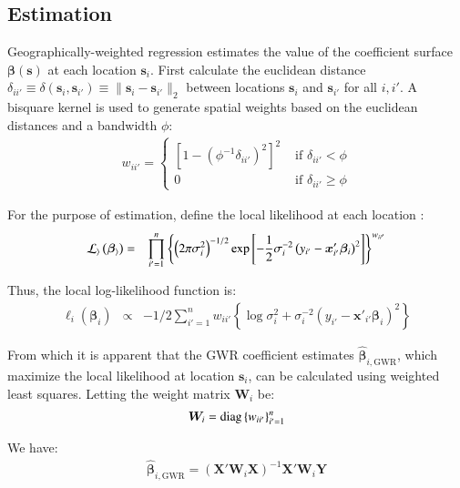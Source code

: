 \documentclass[authoryear, review, 11pt]{elsarticle}
\begin{document}
	\subsection{Estimation}
		
	Geographically-weighted regression estimates the value of the coefficient surface $\bm{\beta}(\bm{s})$ at each location $\bm{s}_i$. First calculate the euclidean distance $\delta_{ii'} \equiv \delta\left(\bm{s}_i, \bm{s}_{i'}\right) \equiv \|\bm{s}_i  -\bm{s}_{i'}\|_2$ between locations $\bm{s}_i$ and $\bm{s}_{i'}$ for all $i, i'$. A bisquare kernel is used to generate spatial weights based on the euclidean distances and a bandwidth $\phi$:\\
	
	\begin{eqnarray}
		w_{ii'} = \begin{cases} \left[1-\left(\phi^{-1}\delta_{ii'}\right)^2\right]^2 &\mbox{ if } \delta_{ii'} < \phi \\ 0 &\mbox{ if } \delta_{ii'} \geq \phi \end{cases}
	\end{eqnarray}
	
	For the purpose of estimation, define the local likelihood at each location \citep{Fotheringham:2002}:
	\begin{eqnarray}
		\cal{L}_i \left(\bm{\beta}_i \right) &=& \prod_{i'=1}^n \left\{ \left(2 \pi \sigma^2_i  \right)^{-1/2}  \exp\left[-\frac{1}{2} \sigma^{-2}_i  \left(y_{i'} - \bm{x}'_{i'} \bm{\beta}_i \right)^2 \right] \right\} ^ {w_{ii'}}
	\end{eqnarray}
			
	Thus, the local log-likelihood function is:
	\begin{eqnarray}\label{eq:local-log-likelihood}
		\ell_i\left(\bm{\beta}_i\right) &\propto& -1/2 \sum_{i'=1}^n w_{ii'} \left\{ \log{\sigma^2_i}  + \sigma^{-2}_i  \left(y_{i'} - \bm{x}'_{i'} \bm{\beta}_i \right)^2 \right\}
	\end{eqnarray}
	
	From which it is apparent that the GWR coefficient estimates $\hat{\bm{\beta}}_{i,\text{GWR}}$, which maximize the local likelihood at location $\bm{s}_i$, can be calculated using weighted least squares. Letting the weight matrix $\bm{W}_i$ be:
	\begin{eqnarray}
		\bm{W}_i =  {\rm diag}\left\{w_{ii'}\right\}_{i' = 1}^n
	\end{eqnarray}
	
	We have:	
	\begin{eqnarray}
		\hat{\bm{\beta}}_{i, \text{GWR}} = \left( \bm{X}'\bm{W}_i\bm{X} \right)^{-1} \bm{X}'\bm{W}_i\bm{Y}
	\end{eqnarray}
	
\end{document}
